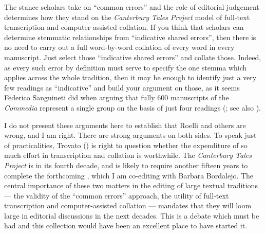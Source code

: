 \begin{review}
The stance scholars take on ``common errors'' and the role of
editorial judgement determines how they stand on the \emph{Canterbury
Tales Project} model of full-text transcription and computer-assisted
collation. If you think that scholars can determine stemmatic
relationships from ``indicative shared errors'', then there is no need
to carry out a full word-by-word collation of every word in every
manuscript. Just select those ``indicative shared errors'' and collate
those. Indeed, as every such error by definition must serve to specify
the one stemma which applies across the whole tradition, then it may be
enough to identify just a very few readings as ``indicative'' and build
your argument on those, as it seems Federico Sanguineti did when arguing
that fully 600 manuscripts of the \emph{Commedia} represent a single
group on the basis of just four readings (\cite[8]{robinson_textual_2012}; see also \cite[50--67]{shaw_introduction_2021}).

I do not present these arguments here to establish that Roelli
and others are wrong, and I am right. There are strong arguments on both
sides. To speak just of practicalities, Trovato (\citeyear{trovato_everything_2017}) is right to
question whether the expenditure of so much effort in transcription and
collation is worthwhile. The \emph{Canterbury Tales Project} is in its
fourth decade, and is likely to require another fifteen years to
complete the forthcoming , which I am co-editing with
Barbara Bordalejo. The central importance of these two matters in the
editing of large textual traditions –– the validity of the ``common
errors'' approach, the utility of full-text transcription and
computer-assisted collation –– mandates that they will loom large in
editorial discussions in the next decades. This is a debate which must
be had and this collection would have been an excellent place to have
started it.


\end{review}
